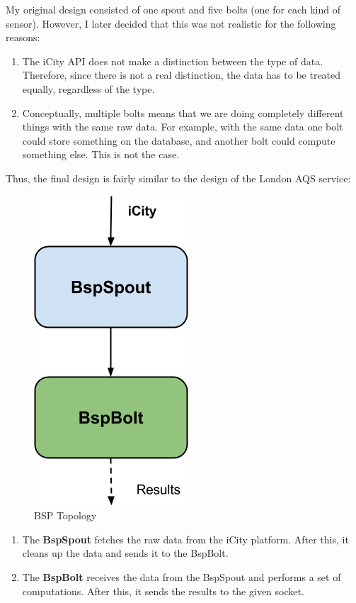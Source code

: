 My original design consisted of one spout and five bolts (one for each kind of
sensor). However, I later decided that this was not realistic for the following
reasons:

\begin{enumerate}
  \itemsep0em
  \item The iCity \ac{API} does not make a distinction between the type of data.
Therefore, since there is not a real distinction, the data has to be treated
equally, regardless of the type.
  \item Conceptually, multiple bolts means that we are doing completely
different things with the same raw data. For example, with the same data one
bolt could store something on the database, and another bolt could compute
something else. This is not the case.
\end{enumerate}

Thus, the final design is fairly similar to the design of the London AQS
service:

\begin{figure}
  \centering
  \includegraphics[scale=0.6]{implementation/images/bsp.png}
  \caption{BSP Topology}\label{fig:bsp_topology}
\end{figure}

\begin{enumerate}
  \itemsep0em
  \item The {\bf BspSpout} fetches the raw data from the iCity platform. After
this, it cleans up the data and sends it to the BspBolt.
  \item The {\bf BspBolt} receives the data from the BspSpout and performs a
set of computations. After this, it sends the results to the given socket.
\end{enumerate}

